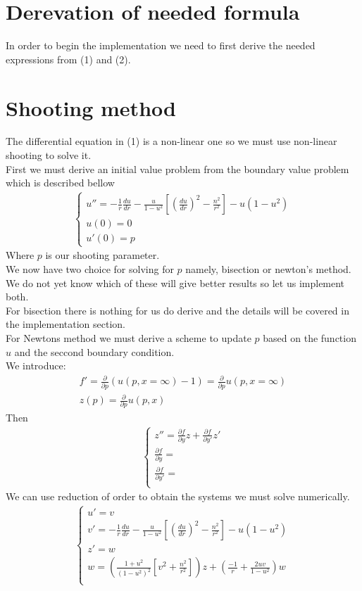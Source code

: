 \documentclass{article}
\begin{document}
\section{Derevation of needed formula}
In order to begin the implementation we need to first derive the needed expressions from (1) and (2).
\section{Shooting method}
The differential equation in (1) is a non-linear one so we must use non-linear shooting to solve it. \\
First we must derive an initial value problem from the boundary value problem which is described bellow 
\begin{align}
\begin{cases}
u'' = -\frac{1}{r}\frac{du}{dr} - \frac{u}{1-u^2}\left[\left(\frac{du}{dr}\right)^2 - \frac{n^2}{r^2}\right] - u(1-u^2) \\
u(0) = 0 \\
u'(0) = p
\end{cases}
\end{align}
Where $p$ is our shooting parameter. \\
We now have two choice for solving for $p$ namely, bisection or newton's method. 
We do not yet know which of these will give better results so let us implement both.  \\
For bisection there is nothing for us do derive and the details will be covered in the implementation section. \\
For Newtons method we must derive a scheme to update $p$ based on the function $u$ and the seccond boundary condition.\\ 
We introduce:
\begin{align}
f' = \frac{\partial }{\partial p}\left(u(p,x=\infty)-1\right) =  \frac{\partial }{\partial p} u(p,x=\infty) \\
z(p) = \frac{\partial }{\partial p} u(p,x)
\end{align}
Then 
\begin{align}
\begin{cases}
z'' = \frac{\partial f}{\partial y}z + \frac{\partial f}{\partial y'}z' \\
 \frac{\partial f}{\partial y} = \\
 \frac{\partial f}{\partial y'} = \\
\end{cases}
\end{align}
We can use reduction of order to obtain the systems we must solve numerically. 
\begin{align}
\begin{cases}
u' = v \\
v' = -\frac{1}{r}\frac{du}{dr} - \frac{u}{1-u^2}\left[\left(\frac{du}{dr}\right)^2 - \frac{n^2}{r^2}\right] - u(1-u^2) \\
z' = w \\
w = \left(\frac{1+u^2}{(1-u^2)^2}\left[ v^2 + \frac{n^2}{r^2} \right] \right)z + \left(\frac{-1}{r} + \frac{2uv}{1-u^2}\right)w \\
\end{cases}
\end{align}
\end{document}
